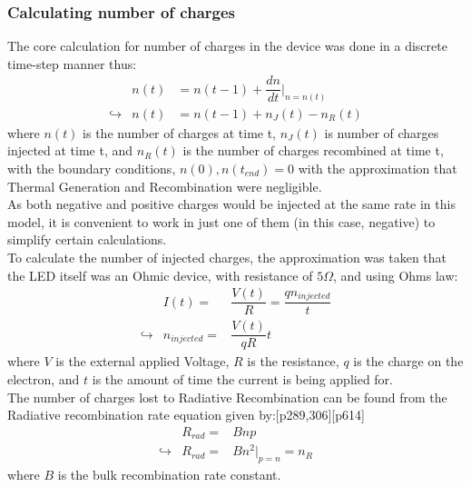 \documentclass[titlepage]{article}
\begin{document}
\subsubsection{Calculating number of charges}
The core calculation for number of charges in the device was done in a discrete time-step manner thus:
\begin{eqnarray}
&n(t) &= n(t-1) + \dfrac{dn}{dt}\Big|_{n=n(t)} \\
\hookrightarrow &n(t) &= n(t-1) + n_J(t) - n_R(t) 
\end{eqnarray}
where $n(t)$ is the number of charges at time t, $n_J(t)$ is number of charges injected at time t, and $n_R(t)$ is the number of charges recombined at time t, with the boundary conditions, $n(0), n(t_{end}) = 0$ with the approximation that Thermal Generation and Recombination were negligible.\\
As both negative and positive charges would be injected at the same rate in this model, it is convenient to work in just one of them (in this case, negative) to simplify certain calculations.\\
To calculate the number of injected charges, the approximation was taken that the LED itself was an Ohmic device, with resistance of $5\Omega$, and using Ohms law:
\begin{eqnarray}
	&I(t) =& \dfrac{V(t)}{R} =  \dfrac{q n_{injected}}{t}\\
\hookrightarrow	&n_{injected} =& \dfrac{V(t)}{qR}t
\end{eqnarray}
where $V$ is the external applied Voltage, $R$ is the resistance, $q$ is the charge on the electron, and $t$ is the amount of time the current is being applied for.\\
The number of charges lost to Radiative Recombination can be found from the  Radiative recombination rate equation given by:\cite{NSD}[p289,306]\cite{Sze}[p614]
\begin{eqnarray}
&R_{rad} =& Bnp\\
\hookrightarrow &R_{rad} =& Bn^2\Big|_{p=n} = n_R 
\end{eqnarray}
where $B$ is the bulk recombination rate constant.\\
\end{document}
